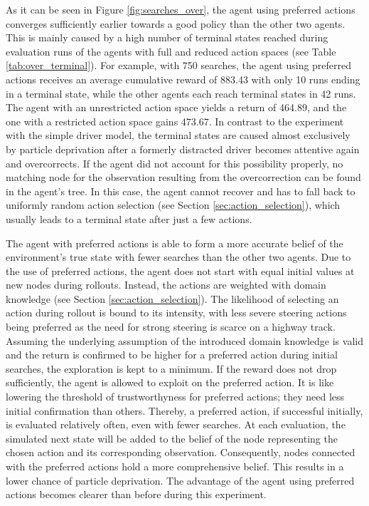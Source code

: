 As it can be seen in Figure \ref{fig:searches_over}, the agent using preferred actions converges sufficiently earlier towards a good policy than the other two agents. This is mainly caused by a high number of terminal states reached during evaluation runs of the agents with full and reduced action spaces (see Table \ref{tab:over_terminal}). For example, with 750 searches, the agent using preferred actions receives an average cumulative reward of 883.43 with only 10 runs ending in a terminal state, while the other agents each reach terminal states in 42 runs. The agent with an unrestricted action space yields a return of 464.89, and the one with a restricted action space gains 473.67. In contrast to the experiment with the simple driver model, the terminal states are caused almost exclusively by particle deprivation after a formerly distracted driver becomes attentive again and overcorrects. If the agent did not account for this possibility properly, no matching node for the observation resulting from the overcorrection can be found in the agent's tree. In this case, the agent cannot recover and has to fall back to uniformly random action selection (see Section \ref{sec:action_selection}), which usually leads to a terminal state after just a few actions. %

The agent with preferred actions is able to form a more accurate belief of the environment's true state with fewer searches than the other two agents. Due to the use of preferred actions, the agent does not start with equal initial values at new nodes during rollouts. Instead, the actions are weighted with domain knowledge (see Section \ref{sec:action_selection}). The likelihood of selecting an action during rollout is bound to its intensity, with less severe steering actions being preferred as the need for strong steering is scarce on a highway track. Assuming the underlying assumption of the introduced domain knowledge is valid and the return is confirmed to be higher for a preferred action during initial searches, the exploration is kept to a minimum. If the reward does not drop sufficiently, the agent is allowed to exploit on the preferred action. It is like lowering the threshold of trustworthyness for preferred actions; they need less initial confirmation than others. Thereby, a preferred  action, if successful initially, is evaluated relatively often, even with fewer searches. At each evaluation, the simulated next state will be added to the belief of the node representing the chosen action and its corresponding observation. Consequently, nodes connected with the preferred actions hold a more comprehensive belief. This results in a lower chance of particle deprivation. The advantage of the agent using preferred actions becomes clearer than before during this experiment.

